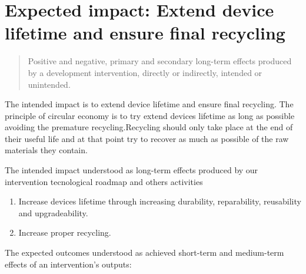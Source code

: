 \documentclass[
]{book}
\providecommand{\tightlist}{%
  \setlength{\itemsep}{0pt}\setlength{\parskip}{0pt}}
\begin{document}
\hypertarget{expected-impact-extend-device-lifetime-and-ensure-final-recycling}{%
\section{Expected impact: Extend device lifetime and ensure final recycling}\label{expected-impact-extend-device-lifetime-and-ensure-final-recycling}}

\begin{quote}
Positive and negative, primary and secondary long-term effects produced by a development intervention, directly or indirectly, intended or unintended.
\end{quote}

The intended impact is to extend device lifetime and ensure final recycling. The principle of circular economy is to try extend devices lifetime as long as possible avoiding the premature recycling.Recycling should only take place at the end of their useful life and at that point try to recover as much as possible of the raw materials they contain.

The intended impact understood as long-term effects produced by our intervention tecnological roadmap and others activities

\begin{enumerate}
\def\labelenumi{\arabic{enumi}.}
\tightlist
\item
  Increase devices lifetime through increasing durability, reparability, reusability and upgradeability.
\item
  Increase proper recycling.
\end{enumerate}

The expected outcomes understood as achieved short-term and medium-term effects of an intervention's outputs:
\end{document}
